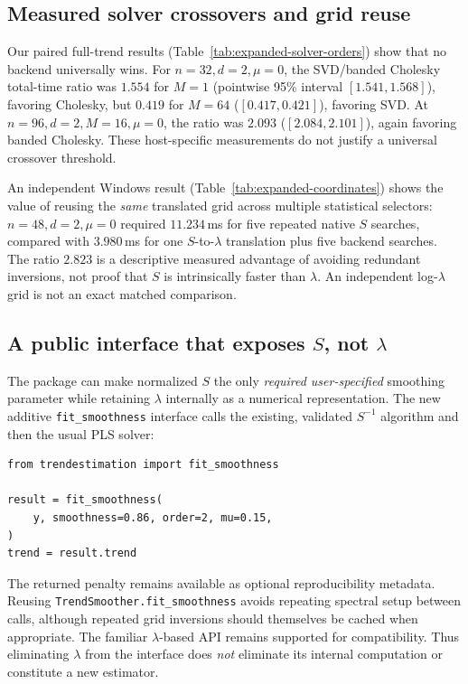 \subsection{Measured solver crossovers and grid reuse}
\label{sec:sncs-measured-crossovers}
Our paired full-trend results
(Table~\ref{tab:expanded-solver-orders})
show that no backend universally wins.
For $n=32,d=2,\mu=0$, the SVD/banded
Cholesky total-time ratio was $1.554$
for $M=1$ (pointwise 95\% interval
$[1.541,1.568]$), favoring Cholesky,
but $0.419$ for $M=64$
($[0.417,0.421]$), favoring SVD.
At $n=96,d=2,M=16,\mu=0$,
the ratio was $2.093$
($[2.084,2.101]$), again favoring
banded Cholesky. These host-specific
measurements do not justify a
universal crossover threshold.

An independent Windows result
(Table~\ref{tab:expanded-coordinates})
shows the value of reusing the
\emph{same} translated grid across
multiple statistical selectors:
$n=48,d=2,\mu=0$ required
$11.234$\,ms for five repeated native
$S$ searches, compared with
$3.980$\,ms for one $S$-to-$\lambda$
translation plus five backend
searches. The ratio $2.823$ is
a descriptive measured advantage
of avoiding redundant inversions,
not proof that $S$ is intrinsically
faster than $\lambda$. An
independent log-$\lambda$ grid
is not an exact matched comparison.

\subsection{A public interface that exposes $S$, not $\lambda$}
\label{sec:sncs-s-only-api}
The package can make normalized $S$
the only \emph{required user-specified}
smoothing parameter while retaining
$\lambda$ internally as a numerical
representation. The new additive
\texttt{fit\_smoothness} interface
calls the existing, validated
$S^{-1}$ algorithm and then the
usual PLS solver:
\begin{verbatim}
from trendestimation import fit_smoothness

result = fit_smoothness(
    y, smoothness=0.86, order=2, mu=0.15,
)
trend = result.trend
\end{verbatim}
The returned penalty remains
available as optional reproducibility
metadata. Reusing
\texttt{TrendSmoother.fit\_smoothness}
avoids repeating spectral setup
between calls, although repeated
grid inversions should themselves
be cached when appropriate.
The familiar $\lambda$-based API
remains supported for compatibility.
Thus eliminating $\lambda$ from
the interface does \emph{not}
eliminate its internal computation
or constitute a new estimator.
